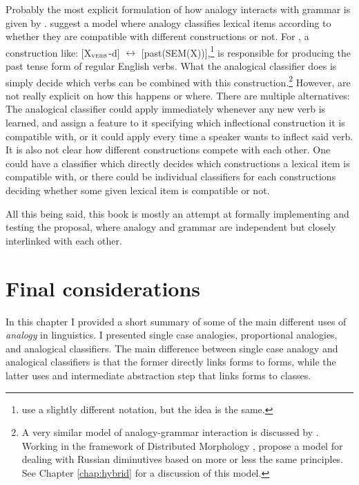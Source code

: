 Probably the most explicit formulation of how analogy interacts with grammar is given by \textcite{Bybee.2015}. \citeauthor{Bybee.2015} suggest a model where analogy classifies lexical items according to whether they are compatible with different constructions or not. For \textcite{Bybee.2015}, a construction like: [X$_{\textsc{verb}}$-d] $\leftrightarrow$ [past(SEM(X))],\footnote{\textcite{Bybee.2015} use a slightly different notation, but the idea is the same.} is responsible for producing the past tense form of regular English verbs. What the analogical classifier does is simply decide which verbs can be combined with this construction.\footnote{A very similar model of analogy-grammar interaction is discussed by \textcite{Gouskova.2015}. Working in the framework of Distributed Morphology \autocite{Halle.1993}, \textcite{Gouskova.2015} propose a model for dealing with Russian diminutives based on more or less the same principles. See Chapter \ref{chap:hybrid} for a discussion of this model.} However, \textcite{Bybee.2015} are not really explicit on how this happens or where. There are multiple alternatives: The analogical classifier could apply immediately whenever any new verb is learned, and assign a feature to it specifying which inflectional construction it is compatible with, or it could apply every time a speaker wants to inflect said verb. It is also not clear how different constructions compete with each other. One could have a classifier which directly decides which constructions a lexical item is compatible with, or there could be individual classifiers for each constructions deciding whether some given lexical item is compatible or not.

All this being said, this book is mostly an attempt at formally implementing and testing the \citeauthor{Bybee.2015} proposal, where analogy and grammar are independent but closely interlinked with each other.

\section{Final considerations}

In this chapter I provided a short summary of some of the main different uses of \textit{analogy} in linguistics. I presented single case analogies, proportional analogies, and analogical classifiers. The main difference between single case analogy and analogical classifiers is that the former directly links forms to forms, while the latter uses and intermediate abstraction step that links forms to classes.

